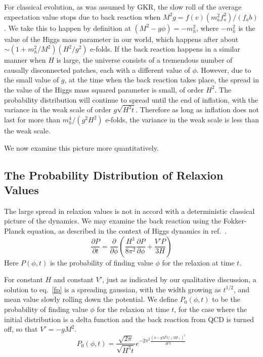 \documentclass[12pt,aps,prd,showpacs,notitlepage,nofootinbib]{revtex4-1}
\newcommand{\beq}{\begin{equation}}
\newcommand{\eeq}{\end{equation}}
\begin{document}
 For classical evolution, as was assumed by GKR, the slow roll of the average expectation value stops due to back reaction when $M^2 g= f(v) (m_a^2 f^2_a)/(f_a b)$. We take this to happen by definition at $(M^2-g\phi)=-m_h^2$, where $-m_h^2$ is the value of the Higgs mass parameter in our world, which happens after about $\sim (1+ m_h^2/M^2)(H^2/g^2)$ e-folds. If the back reaction happens in a similar manner when $H$ is large, the universe consists of a tremendous number of causally disconnected patches, each with a different value of $\phi$. However, due to the small value of $g$, at the time when the back reaction takes place, the spread in the value of the Higgs mass squared parameter is small, of order $H^2$.  The probability distribution will continue to spread  until the end of inflation, with the variance in the weak scale of order $g\sqrt{H^3 t}$. Therefore 
as long as inflation does not last for more than $m_h^4/(g^2 H^2) $ e-folds, the variance in the weak scale is less than the weak scale.

We now examine this picture more quantitatively.
 
 \subsection{The Probability Distribution of Relaxion Values}\label{probability}
The large spread in relaxion values is not in accord with a deterministic classical picture of the dynamics. We may examine the back reaction using the Fokker-Planck equation,  as described in the context of Higgs dynamics in ref.~\cite{Espinosa:2007qp}. 
 \beq\label{fp}
 \frac{\partial P}{\partial t}=
 \frac{\partial}{\partial \phi} \left( \frac{H^3}{8 \pi^2} \frac{\partial P}{\partial \phi} + \frac{V' P}{3 H} \right)
 \eeq
  Here   $P(\phi,t)$ is the probability of finding value $\phi$ for the relaxion at time $t$.

 
 For  constant $H$ and constant $V'$, just as indicated by our qualitative discussion, a solution to eq.~\ref{fp}  is a spreading   gaussian, with the width growing as $t^{1/2}$, and mean value slowly rolling down the potential. We define   $P_0(\phi,t)$ to be the probability of finding value $\phi$ for the relaxion at time $t$, for the case where the initial distribution is a delta function and the back reaction from QCD is turned off, so that $V'=-g M^2$.
 \beq
 \label{fpsol}
P_0(\phi,t)=\frac{
                           \sqrt{2\pi }
                           }{
                              \sqrt{H^3t}
                              }
                              e^{
                              -2\pi^2
                              \frac{
                              \left( \phi - g M^2 t/(3 H)\right)^2
                              }{
                              H^3 t}
                              }
 \eeq
\end{document}
